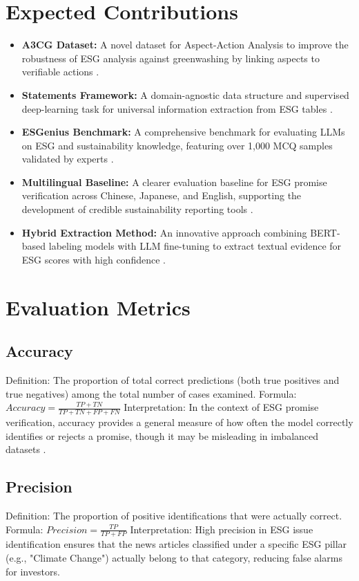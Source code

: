\documentclass{article}
\begin{document}
\section{Expected Contributions}
\begin{itemize}
\item \textbf{A3CG Dataset:} A novel dataset for Aspect-Action Analysis to improve the robustness of ESG analysis against greenwashing by linking aspects to verifiable actions \citep{cite_032}.
\item \textbf{Statements Framework:} A domain-agnostic data structure and supervised deep-learning task for universal information extraction from ESG tables \citep{cite_030}.
\item \textbf{ESGenius Benchmark:} A comprehensive benchmark for evaluating LLMs on ESG and sustainability knowledge, featuring over 1,000 MCQ samples validated by experts \citep{cite_018, cite_029, cite_033}.
\item \textbf{Multilingual Baseline:} A clearer evaluation baseline for ESG promise verification across Chinese, Japanese, and English, supporting the development of credible sustainability reporting tools \citep{cite_027}.
\item \textbf{Hybrid Extraction Method:} An innovative approach combining BERT-based labeling models with LLM fine-tuning to extract textual evidence for ESG scores with high confidence \citep{cite_031}.
\end{itemize}

\section{Evaluation Metrics}
\subsection{Accuracy}
Definition: The proportion of total correct predictions (both true positives and true negatives) among the total number of cases examined.
Formula: $Accuracy = \frac{TP + TN}{TP + TN + FP + FN}$
Interpretation: In the context of ESG promise verification, accuracy provides a general measure of how often the model correctly identifies or rejects a promise, though it may be misleading in imbalanced datasets \citep{cite_027}.

\subsection{Precision}
Definition: The proportion of positive identifications that were actually correct.
Formula: $Precision = \frac{TP}{TP + FP}$
Interpretation: High precision in ESG issue identification ensures that the news articles classified under a specific ESG pillar (e.g., "Climate Change") actually belong to that category, reducing false alarms for investors.
\end{document}
